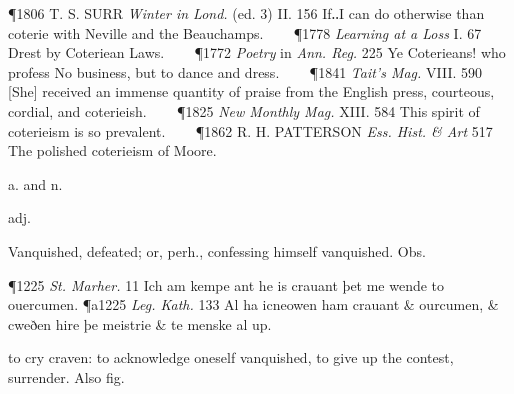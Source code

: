 \begin{description}[wide, labelwidth=!, labelindent=0pt]
\begin{myenumerate}
\vspace{0.1cm} \noindent
{}

\P 1806 T. S. SURR  \textit{Winter in Lond.} (ed. 3) II. 156 If‥I can do otherwise than coterie with Neville and the Beauchamps.    
\P 1778 \textit{Learning  at a Loss} I. 67 Drest by Coteriean Laws.    
\P 1772  \textit{Poetry} in \textit{Ann. Reg.} 225 Ye Coterieans! who profess No business, but to dance and dress.    
\P 1841  \textit{Tait's Mag.} VIII. 590 [She] received an immense quantity of praise from the English press, courteous, cordial, and coterieish.    
\P 1825  \textit{New Monthly Mag.} XIII. 584 This spirit of coterieism is so prevalent.    
\P 1862 R. H. PATTERSON  \textit{Ess. Hist. \& Art} 517 The polished coterieism of Moore.
\end{myenumerate}


 a. and n.

\noindent {}


\begin{myenumerate}

 adj.

 Vanquished, defeated; or, perh., confessing himself vanquished. Obs.

\P 1225 \textit{St. Marher.}  11 Ich am kempe ant he is crauant þet me wende to ouercumen.
\P a1225  \textit{Leg. Kath.} 133 Al ha icneowen ham crauant \& ourcumen, \& cweðen hire þe meistrie \& te menske al up.

 to cry craven: to acknowledge oneself vanquished, to give up the contest, surrender. Also fig.


\end{myenumerate}
\end{description}

